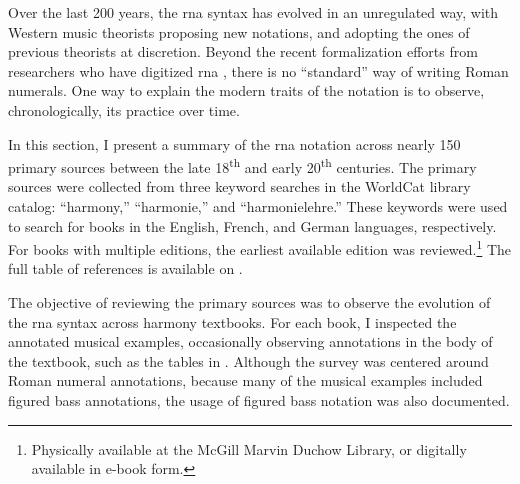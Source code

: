 

Over the last 200 years, the \gls{rna} syntax has evolved in
an unregulated way, with Western music theorists proposing
new notations, and adopting the ones of previous theorists
at discretion. Beyond the recent formalization efforts from
researchers who have digitized \gls{rna}
\parencite{huron1994humdrum, napoleslopez2017automatic,
neuwirth2018annotated, gotham2019romantext,
napoleslopez2020harmalysis, hentschel2021annotated,
hentschel2022towards}, there is no ``standard'' way of
writing Roman numerals. One way to explain the modern traits
of the notation is to observe, chronologically, its practice
over time.

In this section, I present a summary of the \gls{rna}
notation across nearly 150 primary sources between the late
18\textsuperscript{th} and early 20\textsuperscript{th}
centuries. The primary sources were collected from three
keyword searches in the
WorldCat library
catalog: ``harmony,'' ``harmonie,'' and ``harmonielehre.''
These keywords were used to search for books in the English,
French, and German languages, respectively. For books with
multiple editions, the earliest available edition was
reviewed.\footnote{Physically available at the McGill Marvin
Duchow Library, or digitally available in e-book form.} The
full table of references is available on
.


The objective of reviewing the primary sources was to
observe the evolution of the \gls{rna} syntax across harmony
textbooks. For each book, I inspected the annotated musical
examples, occasionally observing annotations in the body of
the textbook, such as the tables in
. Although
the survey was centered around Roman numeral annotations,
because many of the musical examples included figured bass
annotations, the usage of figured bass notation was also
documented. 
